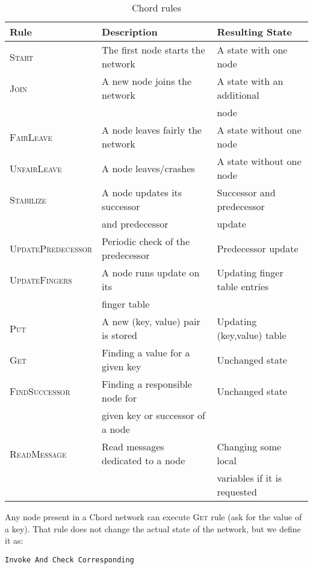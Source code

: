 \documentclass{amsart}
\theoremstyle{definition}
\begin{document}
\begin{table}
\centering
 \begin{tabular}[]{|l|l|l|}
  \hline
  \textbf{Rule} & \textbf{Description} & \textbf{Resulting State} \\
\hline
\textsc{Start} & The first node starts the network & A state with one node \\
\hline
\textsc{Join} & A new node joins the network & A state with an additional \\
   & & node \\
\hline
\textsc{FairLeave} & A node leaves fairly the network & A state without one node \\
\hline
  \textsc{UnfairLeave} & A node leaves/crashes & A state without one node \\
\hline
\textsc{Stabilize} & A node updates its successor & Successor and predecessor\\
   & and predecessor & update\\
\hline
\textsc{UpdatePredecessor} & Periodic check of the predecessor & Predecessor update \\
\hline
\textsc{UpdateFingers} & A node runs update on its  & Updating finger table entries  \\
  & finger table& \\
\hline
\textsc{Put} & A new (key, value) pair is stored & Updating (key,value) table \\
\hline
\textsc{Get} & Finding a value for a given key & Unchanged state \\ \hline
\textsc{FindSuccessor} & Finding a responsible node for & Unchanged state \\
  & given key or successor of a node& \\
\hline
\textsc{ReadMessage} & Read messages dedicated to a node & Changing some local  \\
  & & variables if it is requested \\ \hline
\end{tabular}

\caption{Chord rules} \label{chord_actions}
\vspace{-0.5cm}
\end{table}




Any node present in a Chord network can execute \textsc{Get} rule (ask for the value of a key). That rule does not
change the actual state of the network, but we define it as:
\begin{lstlisting}[escapechar=\%]
Invoke And Check Corresponding \end{lstlisting}
\end{document}
